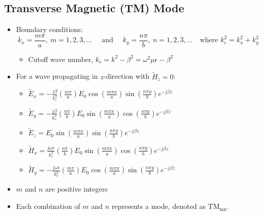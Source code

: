 \documentclass[a4paper]{article}
\begin{document}
\subsection{Transverse Magnetic (TM) Mode}
\begin{itemize}
    \item Boundary conditions:
    $$k_x = \frac{m\pi}{a},\ m=1, 2, 3,\ldots\quad\text{ and }\quad k_y = \frac{n\pi}{b},\ n=1, 2, 3,\ldots\quad\text{where }k_c^2 = k_x^2+k_y^2$$
    \begin{itemize}[label=$\circ$]
        \item Cutoff wave number, $k_c = k^2-\beta^2 = \omega^2\mu\epsilon-\beta^2$
    \end{itemize}
    \item For a wave propagating in $z$-direction with $\widetilde{H}_z = 0$:
    \begin{itemize}[label=$\circ$]
        \item $\widetilde{E}_x = -\displaystyle\frac{j\beta}{k_c^2}\left(\displaystyle\frac{m\pi}{a}\right)E_0\cos\left(\displaystyle\frac{m\pi x}{a}\right)\sin\left(\displaystyle\frac{n\pi y}{b}\right)e^{-j\beta z}$
        \item $\widetilde{E}_y = -\displaystyle\frac{j\beta}{k_c^2}\left(\displaystyle\frac{n\pi}{b}\right)E_0\sin\left(\displaystyle\frac{m\pi x}{a}\right)\cos\left(\displaystyle\frac{n\pi y}{b}\right)e^{-j\beta z}$
        \item $\widetilde{E}_z = E_0\sin\left(\displaystyle\frac{m\pi x}{a}\right)\sin\left(\displaystyle\frac{n\pi y}{b}\right)e^{-j\beta z}$
        \item $\widetilde{H}_x = \displaystyle\frac{j\omega\epsilon}{k_c^2}\left(\displaystyle\frac{n\pi}{b}\right)E_0\sin\left(\displaystyle\frac{m\pi x}{a}\right)\cos\left(\displaystyle\frac{n\pi y}{b}\right)e^{-j\beta z}$
        \item $\widetilde{H}_y = - \displaystyle\frac{j\omega\epsilon}{k_c^2}\left(\displaystyle\frac{m\pi}{a}\right)E_0\cos\left(\displaystyle\frac{m\pi x}{a}\right)\sin\left(\displaystyle\frac{n\pi y}{b}\right)e^{-j\beta z}$
    \end{itemize}
    \item $m$ and $n$ are positive integers
    \item Each combination of $m$ and $n$ represents a mode, denoted as $\text{TM}_\text{mn}$.
\end{itemize}

\newpage
\end{document}
